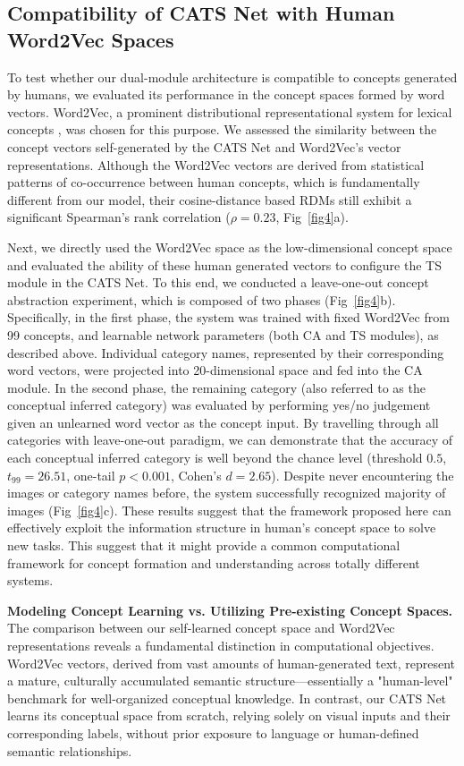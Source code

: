 \documentclass[pdflatex,sn-mathphys-num,lineno]{sn-jnl}%
\begin{document}
\begin{CJK}{UTF8}{gbsn}
\subsection{Compatibility of CATS Net with Human Word2Vec Spaces} 

To test whether our dual-module architecture is compatible to concepts generated by humans, we evaluated its performance in the concept spaces formed by word vectors. Word2Vec, a prominent distributional representational system for lexical concepts \cite{mikolov_distributed_2013,mikolov_advances_2018}, was chosen for this purpose. We assessed the similarity between the concept vectors self-generated by the CATS Net and Word2Vec’s vector representations. Although the Word2Vec vectors are derived from statistical patterns of co-occurrence between human concepts, which is fundamentally different from our model, their cosine-distance based RDMs still exhibit a significant Spearman’s rank correlation ($\rho=0.23$, Fig~\ref{fig4}a). 

Next, we directly used the Word2Vec space as the low-dimensional concept space and evaluated the ability of these human generated vectors to configure the TS module in the CATS Net. To this end, we conducted a leave-one-out concept abstraction experiment, which is composed of two phases (Fig~\ref{fig4}b). Specifically, in the first phase, the system was trained with fixed Word2Vec from 99 concepts, and learnable network parameters (both CA and TS modules), as described above. Individual category names, represented by their corresponding word vectors, were projected into 20-dimensional space and fed into the CA module. In the second phase, the remaining category (also referred to as the conceptual inferred category) was evaluated by performing yes/no judgement given an unlearned word vector as the concept input. By travelling through all categories with leave-one-out paradigm, we can demonstrate that the accuracy of each conceptual inferred category is well beyond the chance level (threshold $0.5$, $t_{99}=26.51$, one-tail $p < 0.001$, Cohen's $d = 2.65$). Despite never encountering the images or category names before, the system successfully recognized majority of images (Fig~\ref{fig4}c). These results suggest that the framework proposed here can effectively exploit the information structure in human's concept space to solve new tasks. This suggest that it might provide a common computational framework for concept formation and understanding across totally different systems.

\textbf{Modeling Concept Learning vs. Utilizing Pre-existing Concept Spaces.} The comparison between our self-learned concept space and Word2Vec representations reveals a fundamental distinction in computational objectives. Word2Vec vectors, derived from vast amounts of human-generated text, represent a mature, culturally accumulated semantic structure—essentially a "human-level" benchmark for well-organized conceptual knowledge. In contrast, our CATS Net learns its conceptual space from scratch, relying solely on visual inputs and their corresponding labels, without prior exposure to language or human-defined semantic relationships.


\end{CJK}
\end{document}

